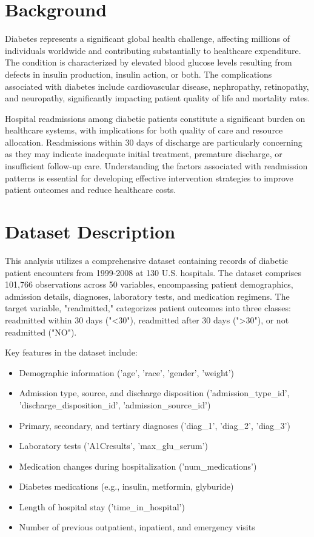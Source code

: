 \section{Background}

Diabetes represents a significant global health challenge, affecting millions of individuals worldwide and contributing substantially to healthcare expenditure. 
The condition is characterized by elevated blood glucose levels resulting from defects in insulin production, insulin action, or both. 
The complications associated with diabetes include cardiovascular disease, nephropathy, retinopathy, and neuropathy, significantly impacting patient quality of life and mortality rates.

Hospital readmissions among diabetic patients constitute a significant burden on healthcare systems, with implications for both quality of care and resource allocation. Readmissions within 30 days of discharge are particularly concerning as they may indicate inadequate initial treatment, premature discharge, or insufficient follow-up care. Understanding the factors associated with readmission patterns is essential for developing effective intervention strategies to improve patient outcomes and reduce healthcare costs.

\section{Dataset Description}

This analysis utilizes a comprehensive dataset containing records of diabetic patient encounters from 1999-2008 at 130 U.S. hospitals. The dataset comprises 101,766 observations across 50 variables, encompassing patient demographics, admission details, diagnoses, laboratory tests, and medication regimens. The target variable, "readmitted," categorizes patient outcomes into three classes: readmitted within 30 days ("<30"), readmitted after 30 days (">30"), or not readmitted ("NO").

Key features in the dataset include:
\begin{itemize}
    \item Demographic information ('age', 'race', 'gender', 'weight')
    \item Admission type, source, and discharge disposition ('admission\_type\_id', 'discharge\_disposition\_id', 'admission\_source\_id')
    \item Primary, secondary, and tertiary diagnoses ('diag\_1', 'diag\_2', 'diag\_3')
    \item Laboratory tests ('A1Cresults', 'max\_glu\_serum')
    \item Medication changes during hospitalization ('num\_medications')
    \item Diabetes medications (e.g., insulin, metformin, glyburide)
    \item Length of hospital stay ('time\_in\_hospital')
    \item Number of previous outpatient, inpatient, and emergency visits
\end{itemize}

